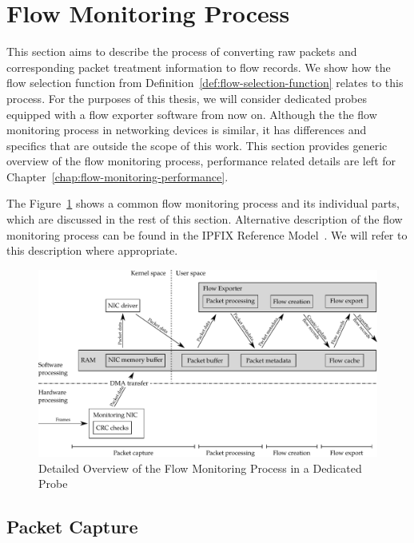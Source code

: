 \section{Flow Monitoring Process}\label{sec:flow-monitoring-process}

This section aims to describe the process of converting raw packets and corresponding packet treatment information to flow records. We show how the flow selection function from Definition~\ref{def:flow-selection-function} relates to this process. For the purposes of this thesis, we will consider dedicated probes equipped with a flow exporter software from now on. Although the the flow monitoring process in networking devices is similar, it has differences and specifics that are outside the scope of this work. This section provides generic overview of the flow monitoring process, performance related details are left for Chapter~\ref{chap:flow-monitoring-performance}.

The Figure~\ref{fig:flow_monitoring_process_detail} shows a common flow monitoring process and its individual parts, which are discussed in the rest of this section. Alternative description of the flow monitoring process can be found in the IPFIX Reference Model~\cite{rfc5470}. We will refer to this description where appropriate.

\begin{figure}
  \begin{center}
    \includegraphics[width=\textheight]{figures/flow-monitoring-process-detail}
  \end{center}
  \caption{Detailed Overview of the Flow Monitoring Process in a Dedicated Probe}
  \label{fig:flow_monitoring_process_detail}
\end{figure}

\subsection{Packet Capture}


